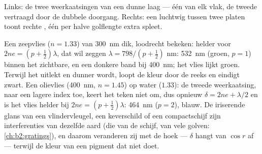 \begin{omfigure}

{\small Links: de twee weerkaatsingen van een dunne laag --- één van elk
vlak, de tweede vertraagd door de dubbele doorgang. Rechts: een
luchtwig tussen twee platen toont rechte , één
per halve golflengte extra spleet.}
\end{omfigure}

\begin{example}\label{ex:b2:two-wave-interference:colours}
Een zeepvlies ($n = 1.33$) van \qty{300}{nm} dik, loodrecht bekeken:
helder voor $2ne = (p + \tfrac12)\lambda$, dat wil zeggen
$\lambda = 798/(p + \tfrac12)$ nm: \qty{532}{nm}
(groen, $p = 1$) binnen het zichtbare, en een donkere band bij \qty{400}{nm}; het
vlies lijkt groen. Terwijl het uitlekt en dunner wordt, loopt de kleur
door de reeks en eindigt zwart. Een olievlies (\qty{400}{nm}, $n = 1.45$) op water
($1.33$): de tweede weerkaatsing, naar een lagere index toe, keert het
teken niet om, dus opnieuw $\delta = 2ne + \lambda/2$ en is het vlies helder
bij $2ne =
(p + \tfrac12)\lambda$: \qty{464}{nm} ($p = 2$), blauw. De
iriserende glans van een
vlindervleugel, een keverschild of een compactschijf zijn interferenties
van dezelfde aard (die van de schijf, van vele golven: \cref{ch:b2:gratings}),
en daarom veranderen zij met de hoek --- $\delta$ hangt van $\cos r$ af ---
terwijl de kleur van een pigment dat niet doet.
\end{example}

